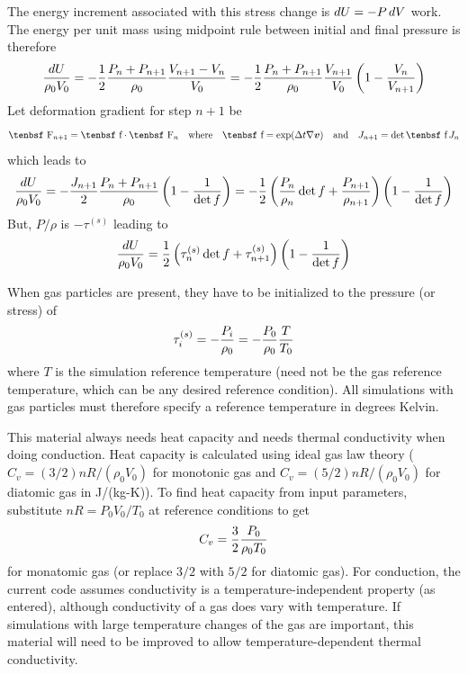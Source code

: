 \documentclass[11pt]{book}
\renewcommand{\vec}[1]{\boldsymbol{#1}}
\def\f{\hbox{\tenbsf f}}
\def\F{\hbox{\tenbsf F}}
\begin{document}
The energy increment associated with this stress change is $dU = -P\thinspace dV$ work. The energy per unit mass using midpoint rule between initial and final pressure is therefore
\begin{equation}
    {dU\over \rho_0 V_0} = - {1\over2} {P_n+P_{n+1}\over \rho_0} 
         {V_{n+1} - V_n\over V_0} = - {1\over2} {P_n+P_{n+1}\over \rho_0} {V_{n+1}\over V_0}
         \left(1 - {V_n\over V_{n+1}}\right)
\end{equation}
Let deformation gradient for step $n+1$ be
\begin{equation}
       \F_{n+1} = \f\cdot\F_n  \quad{\rm where}\quad \f = \exp(\Delta t\nabla\vec v)
       \quad{\rm and}\quad J_{n+1} = \det \f \thinspace J_n
\end{equation}
which leads to
\begin{equation}
    {dU\over \rho_0 V_0} = - {J_{n+1}\over2} {P_n+P_{n+1}\over \rho_0} 
         \left(1 - {1\over\det f}\right) = - {1\over2}
         \left({P_n\over \rho_{n}}\det f+{P_{n+1}\over \rho_{n+1}} \right)
         \left(1 - {1\over\det f}\right)
\end{equation}
But, $P/\rho$ is $-\tau^{(s)}$ leading to
\begin{equation}
    {dU\over \rho_0 V_0} =  {1\over2}
         \left(\tau_n^{(s)}\det f+\tau_{n+1}^{(s)} \right)
         \left(1 - {1\over\det f}\right)
\end{equation}

When gas particles are present, they have to be initialized to the pressure (or stress) of
\begin{equation}
     \tau_i^{(s)} =  - {P_i\over \rho_0} = - {P_0\over \rho_0} {T\over T_0}
\end{equation}
where $T$ is the simulation reference temperature (need not be the gas reference temperature, which can be any desired reference condition). All simulations with gas particles must therefore specify a reference temperature in degrees Kelvin.

This material always needs heat capacity and needs thermal conductivity when doing conduction. Heat capacity is calculated using ideal gas law theory ($C_v=(3/2)nR/(\rho_0 V_0)$ for monotonic gas and $C_v=(5/2)nR/(\rho_0 V_0)$ for diatomic gas in J/(kg-K)). To find heat capacity from input parameters, substitute $nR = P_0V_0/T_0$ at reference conditions to get
\begin{equation}
     C_v =  {3\over 2} {P_0 \over \rho_0T_0}
\end{equation}
for monatomic gas (or replace $3/2$ with $5/2$ for diatomic gas). For conduction, the current code assumes conductivity is a temperature-independent property (as entered), although conductivity of a gas does vary with temperature. If simulations with large temperature changes of the gas are important, this material will need to be improved to allow temperature-dependent thermal conductivity.
\end{document}
